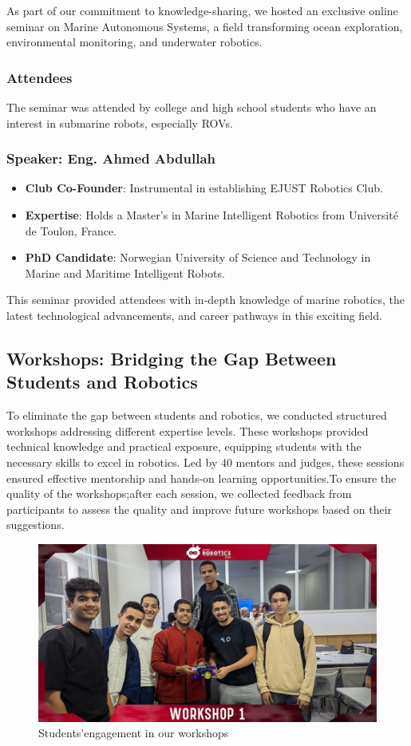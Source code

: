 \documentclass[a4paper,12pt]{article}
\begin{document}
\noindent As part of our commitment to knowledge-sharing, we hosted an exclusive online seminar on Marine Autonomous Systems, a field transforming ocean exploration, environmental monitoring, and underwater robotics.
\subsubsection{Attendees}
The seminar was attended by college and high school students who have an interest in submarine robots, especially ROVs.

\subsubsection{Speaker: Eng. Ahmed Abdullah}
\begin{itemize}
    \item \textbf{Club Co-Founder}: Instrumental in establishing EJUST Robotics Club.
    \item \textbf{Expertise}: Holds a Master’s in Marine Intelligent Robotics from Université de Toulon, France.
    \item \textbf{PhD Candidate}: Norwegian University of Science and Technology in Marine and Maritime Intelligent Robots.

    


\end{itemize}

This seminar provided attendees with in-depth knowledge of marine robotics, the latest technological advancements, and career pathways in this exciting field.

\subsection{Workshops: Bridging the Gap Between Students and Robotics}
To eliminate the gap between students and robotics, we conducted structured workshops addressing different expertise levels. These workshops provided technical knowledge and practical exposure, equipping students with the necessary skills to excel in robotics. Led by 40 mentors and judges, these sessions ensured effective mentorship and hands-on learning opportunities.To ensure the quality of the workshops;after each session, we collected feedback from participants to assess the quality and improve future workshops based on their suggestions.
\begin{figure}[h]
            \centering
            \includegraphics[width=0.49\linewidth]{workshop oo.jpg}
           \caption{Students'engagement in our workshops}
            \label{fig:enter-label}
                \end{figure}
\end{document}
